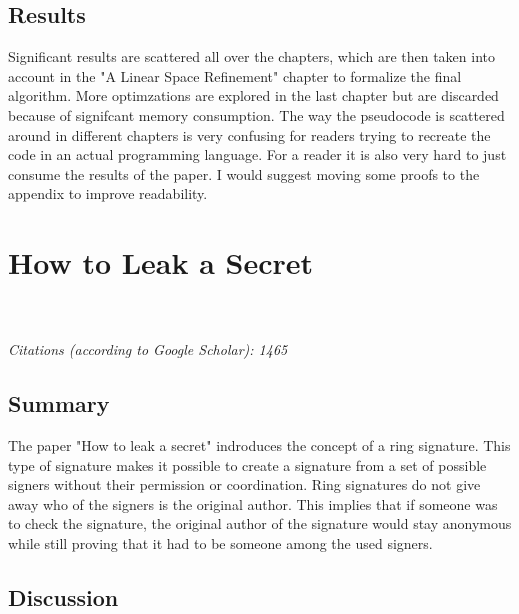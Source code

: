 \documentclass[11pt]{scrartcl}
\begin{document}
\subsection{Results}
Significant results are scattered all over the chapters, which are then taken into account in the "A Linear Space Refinement" chapter to formalize the final algorithm. More optimzations are explored in the last chapter but are discarded because of signifcant memory consumption. The way the pseudocode is scattered around in different chapters is very confusing for readers trying to recreate the code in an actual programming language.
For a reader it is also very hard to just consume the results of the paper. I would suggest moving some proofs to the appendix to improve readability.




\pagebreak
\section{How to Leak a Secret}
\\\\
\emph{Citations (according to Google Scholar): 1465}
\subsection{Summary}
The paper "How to leak a secret" \cite{rivest2001leak} indroduces the concept of a ring signature. This type of signature makes it possible to create a signature from a set of possible signers without their permission or coordination. Ring signatures do not give away who of the signers is the original author.  This implies that if someone was to check the signature, the original author of the signature would stay anonymous while still proving that it had to be someone among the used signers. %

\subsection{Discussion}
\end{document}

